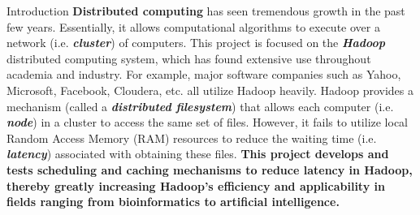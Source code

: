 \documentclass[final]{beamer} %
\begin{document}
  \begin{frame}
    \begin{center}

      \textcolor{black}{
      \textbf{}
      \vspace{0.5em}
      \textbf{}}
    \end{center}
    
    \begin{columns}[t]
     \begin{column}{0.32\textwidth}
      \begin{block}{Introduction}
      \textbf{Distributed computing} has seen tremendous growth in the past few years.
Essentially, it allows computational algorithms to execute over a network (i.e.
\textit{\textbf{cluster}}) of computers. This project is focused on the \textbf{\textit{Hadoop}} distributed
computing system, which has found extensive use throughout academia and
industry. For example, major software companies such as Yahoo, Microsoft, Facebook, Cloudera, etc. all utilize Hadoop heavily. Hadoop provides a mechanism (called a \textit{\textbf{distributed filesystem}}) that 
allows each computer (i.e. \textit{\textbf{node}}) in a cluster to access the same set of files.
However, it fails to utilize local Random Access Memory (RAM) resources to reduce the waiting
time (i.e. \textbf{\textit{latency}}) associated with obtaining these files. \textbf{This project develops and tests scheduling and caching mechanisms to reduce latency in Hadoop, thereby greatly increasing Hadoop's efficiency and applicability in fields ranging from bioinformatics to artificial intelligence.}


\end{block}
\end{column}
\end{columns}
\end{frame}
\end{document}
